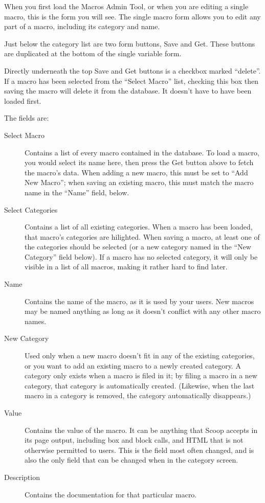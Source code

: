 When you first load the Macros Admin Tool, or when you are editing a single macro, this is the form you will see.  The single macro form allows you to edit any part of a macro, including its category and name.

Just below the category list are two form buttons, Save and Get.  These buttons are duplicated at the bottom of the single variable form.  

Directly underneath the top Save and Get buttons is a checkbox marked ``delete''.  If a macro has been selected from the ``Select Macro'' list, checking this box then saving the macro will delete it from the database.  It doesn't have to have been loaded first.

The fields are:

\begin{description}
\item[Select Macro] Contains a list of every macro contained in the database.  To load a macro, you would select its name here, then press the Get button above to fetch the macro's data.  When adding a new macro, this must be set to ``Add New Macro''; when saving an existing macro, this must match the macro name in the ``Name'' field, below.
\item[Select Categories] Contains a list of all existing categories.  When a macro has been loaded, that macro's categories are hilighted.  When saving a macro, at least one of the categories should be selected (or a new category named in the ``New Category'' field below).  If a macro has no selected category, it will only be visible in a list of all macros, making it rather hard to find later.
\item[Name] Contains the name of the macro, as it is used by your users.  New macros may be named anything as long as it doesn't conflict with any other macro names.
\item[New Category] Used only when a new macro doesn't fit in any of the existing categories, or you want to add an existing macro to a newly created category.  A category only exists when a macro is filed in it; by filing a macro in a new category, that category is automatically created.  (Likewise, when the last macro in a category is removed, the category automatically disappears.)
\item[Value] Contains the value of the macro.  It can be anything that Scoop accepts in its page output, including box and block calls, and HTML that is not otherwise permitted to users.  This is the field most often changed, and is also the only field that can be changed when in the category screen.
\item[Description] Contains the documentation for that particular macro.
\end{description}

